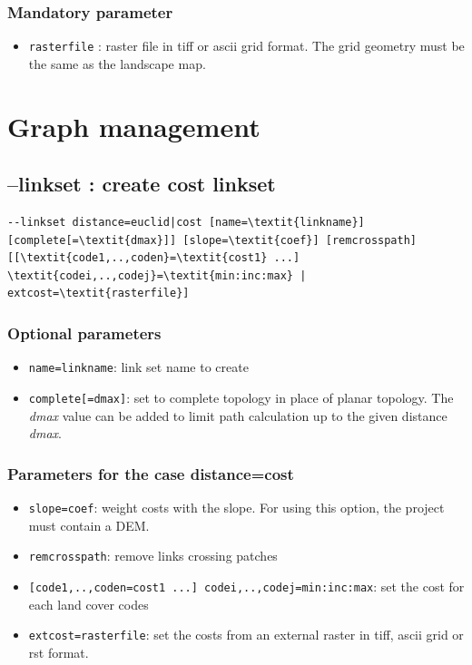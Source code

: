 \documentclass[a4paper,10pt]{report}
\begin{document}
\subsubsection{Mandatory parameter}
\begin{itemize}
	\item \verb|rasterfile| : raster file in tiff or ascii grid format. The grid geometry must be the same as the landscape map.
\end{itemize}

\section{Graph management}

\subsection{--linkset : create cost linkset}
\begin{Verbatim}[commandchars=\\\{\}]
--linkset distance=euclid|cost [name=\textit{linkname}] [complete[=\textit{dmax}]] [slope=\textit{coef}] [remcrosspath] 
[[\textit{code1,..,coden}=\textit{cost1} ...] \textit{codei,..,codej}=\textit{min:inc:max} | extcost=\textit{rasterfile}]
\end{Verbatim}

\subsubsection{Optional parameters}
\begin{itemize}
	\item \verb|name=linkname|: link set name to create
	\item \verb|complete[=dmax]|: set to complete topology in place of planar topology. The \textit{dmax} value can be added to limit path calculation up to the given distance \textit{dmax}.
\end{itemize}

\subsubsection{Parameters for the case distance=cost}
\begin{itemize}
	\item \verb|slope=coef|: weight costs with the slope. For using this option, the project must contain a DEM.
	\item \verb|remcrosspath|: remove links crossing patches
	\item \verb|[code1,..,coden=cost1 ...] codei,..,codej=min:inc:max|: set the cost for each land cover codes
	\item \verb|extcost=rasterfile|: set the costs from an external raster in tiff, ascii grid or rst format.
\end{itemize}
\end{document}
